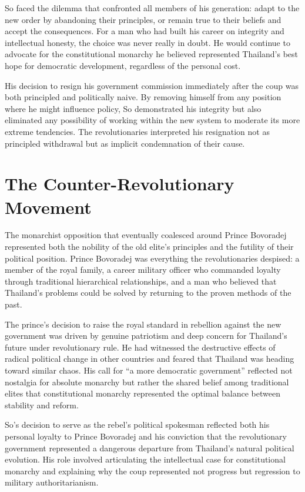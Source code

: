 \documentclass[
  Letterpaper,
]{scrbook}
\begin{document}
So faced the dilemma that confronted all members of his generation:
adapt to the new order by abandoning their principles, or remain true to
their beliefs and accept the consequences. For a man who had built his
career on integrity and intellectual honesty, the choice was never
really in doubt. He would continue to advocate for the constitutional
monarchy he believed represented Thailand's best hope for democratic
development, regardless of the personal cost.

His decision to resign his government commission immediately after the
coup was both principled and politically naive. By removing himself from
any position where he might influence policy, So demonstrated his
integrity but also eliminated any possibility of working within the new
system to moderate its more extreme tendencies. The revolutionaries
interpreted his resignation not as principled withdrawal but as implicit
condemnation of their cause.

\section{The Counter-Revolutionary
Movement}\label{the-counter-revolutionary-movement}

The monarchist opposition that eventually coalesced around Prince
Bovoradej represented both the nobility of the old elite's principles
and the futility of their political position. Prince Bovoradej was
everything the revolutionaries despised: a member of the royal family, a
career military officer who commanded loyalty through traditional
hierarchical relationships, and a man who believed that Thailand's
problems could be solved by returning to the proven methods of the past.

The prince's decision to raise the royal standard in rebellion against
the new government was driven by genuine patriotism and deep concern for
Thailand's future under revolutionary rule. He had witnessed the
destructive effects of radical political change in other countries and
feared that Thailand was heading toward similar chaos. His call for ``a
more democratic government'' reflected not nostalgia for absolute
monarchy but rather the shared belief among traditional elites that
constitutional monarchy represented the optimal balance between
stability and reform.

So's decision to serve as the rebel's political spokesman reflected both
his personal loyalty to Prince Bovoradej and his conviction that the
revolutionary government represented a dangerous departure from
Thailand's natural political evolution. His role involved articulating
the intellectual case for constitutional monarchy and explaining why the
coup represented not progress but regression to military
authoritarianism.
\end{document}
